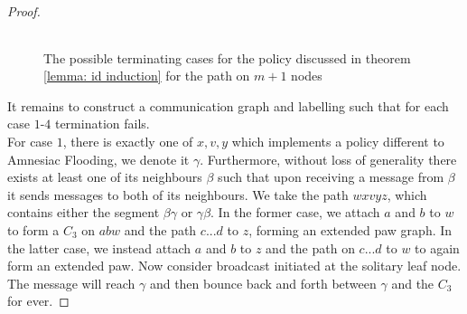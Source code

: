 \begin{proof}
\begin{figure}
{\begin{tabular}{|c|c|c|c|}
             \hline
        \end{tabular}}
        \caption{The possible terminating cases for the policy discussed in theorem \ref{lemma: id induction} for the path on $m+1$ nodes}
        \label{fig:table}
    \end{figure}
    It remains to construct a communication graph and labelling such that for each case $1$-$4$ termination fails.\\
    For case $1$, there is exactly one of $x,v,y$ which implements a policy different to Amnesiac Flooding, we denote it $\gamma$.
    Furthermore, without loss of generality there exists at least one of its neighbours $\beta$ such that upon receiving a message from $\beta$ it sends messages to both of its neighbours.
    We take the path $wxvyz$, which contains either the segment $\beta \gamma$ or $\gamma \beta$.
    In the former case, we attach $a$ and $b$ to $w$ to form a $C_3$ on $abw$ and the path $c...d$ to $z$, forming an extended paw graph.
    In the latter case, we instead attach $a$ and $b$ to $z$ and the path on $c...d$ to $w$ to again form an extended paw.
    Now consider broadcast initiated at the solitary leaf node.
    The message will reach $\gamma$ and then bounce back and forth between $\gamma$ and the $C_3$ for ever.


\end{proof}
